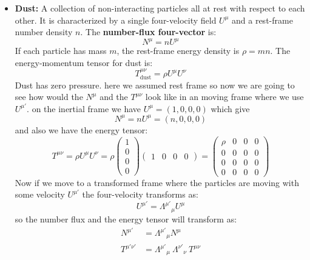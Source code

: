 \documentclass[11pt, a4paper]{report}
\begin{document}
\begin{itemize}
    \item \textbf{Dust:} A collection of non-interacting particles all at rest with respect to each other. It is characterized by a single four-velocity field $U^\mu$ and a rest-frame number density $n$. The \textbf{number-flux four-vector} is:
    \begin{equation}
        N^\mu = nU^\mu
    \end{equation}
    If each particle has mass $m$, the rest-frame energy density is $\rho = mn$. The energy-momentum tensor for dust is:
    \begin{equation}
        T^{\mu\nu}_{\text{dust}} = \rho U^\mu U^\nu
    \end{equation}
    Dust has zero pressure.
    here we assumed rest frame so now we are going to see how would the $N^\mu$ and the $T^{\mu\nu}$ look like in an moving frame where we use $U^{\mu'}$.
    on the inertial frame we have $U^\mu = (1,0,0,0)$ which give 
    $$N^\mu = n U^\mu = (n,0,0,0) $$  
    and also we have the energy tensor: 
    \begin{equation}
    T^{\mu\nu} = \rho U^\mu U^\nu = \rho 
    \begin{pmatrix}
        1 \\
        0 \\
        0 \\
        0 
    \end{pmatrix}
    \begin{pmatrix}
        1 & 0 & 0 & 0
    \end{pmatrix}
    =
    \begin{pmatrix}
    \rho & 0 & 0 & 0 \\
    0 & 0 & 0 & 0 \\
    0 & 0 & 0 & 0 \\
    0 & 0 & 0 & 0
    \end{pmatrix}
    \end{equation}
    Now if we move to a transformed frame where the particles are moving with some velocity $U^{\mu'}$ the four-velocity transforms as:
    \begin{equation}
        U^{\mu'} = {\Lambda^{\mu'}}_\mu U^\mu
    \end{equation}
    so the number flux and the energy tensor will transform as:
    \begin{align*}     
        N^{\mu'} &= {\Lambda^{\mu'}}_\mu N^\mu \\
        T^{\mu'\nu'} &= {\Lambda^{\mu'}}_\mu \ {\Lambda^{\nu'}}_\nu \ T^{\mu\nu}

\end{align*}
\end{itemize}
\end{document}
